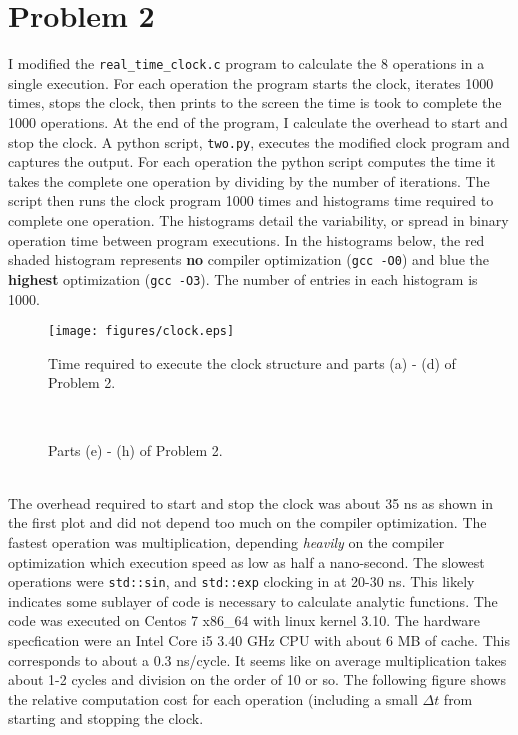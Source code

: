 \documentclass[singlepage,notitlepage,nofootinbib,11pt]{revtex4-1}
\begin{document}
\section{Problem 2}
I modified the \verb|real_time_clock.c| program to calculate the 8 operations in a single execution. For each operation the program starts the clock, iterates 1000 times, stops the clock, then prints to the screen the time is took to complete the 1000 operations. At the end of the program, I calculate the overhead to start and stop the clock. A python script, \verb|two.py|, executes the modified clock program and captures the output. For each operation the python script computes the time it takes the complete one operation by dividing by the number of iterations. The script then runs the clock program 1000 times and histograms time required to complete one operation. The histograms detail the variability, or spread in binary operation time between program executions. In the histograms below, the red shaded histogram represents {\bf no} compiler optimization (\verb|gcc -O0|) and blue the {\bf highest} optimization (\verb|gcc -O3|). The number of entries in each histogram is 1000.
\begin{figure}[h]
  \centering
  \texttt{[image: figures/clock.eps]}
  \\
\caption{Time required to execute the clock structure and parts (a) - (d) of Problem 2.}
\end{figure} 
\begin{figure}[h]
\ContinuedFloat
\centering
  \\
\caption{Parts (e) - (h) of Problem 2.}
\end{figure}\\
\indent The overhead required to start and stop the clock was about 35 ns as shown in the first plot and did not depend too much on the compiler optimization. The fastest operation was multiplication, depending {\it heavily} on the compiler optimization which execution speed as low as half a nano-second. The slowest operations were \verb|std::sin|, and \verb|std::exp| clocking in at 20-30 ns. This likely indicates some sublayer of code is necessary to calculate analytic functions. The code was executed on Centos 7 x86\_64 with linux kernel 3.10. The hardware specfication were an Intel Core i5  3.40 GHz CPU with about 6 MB of cache. This corresponds to about a 0.3 ns/cycle. It seems like on average multiplication takes about 1-2 cycles and division on the order of 10 or so. The following figure shows the relative computation cost for each operation (including a small $\Delta t$ from starting and stopping the clock.
\end{document}
